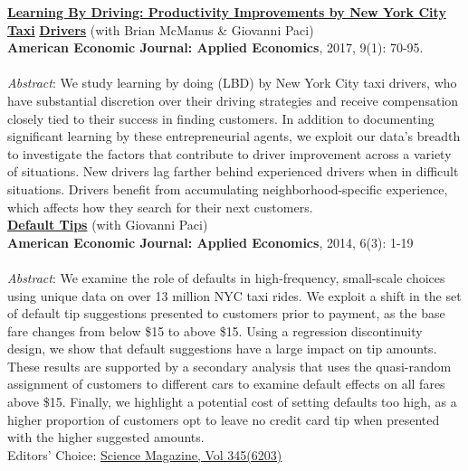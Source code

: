 \documentclass[11pt]{article}
\begin{document}
\href{http://www.kareemhaggag.com/f/Learning_by_Driving.pdf}
{\textbf{Learning By Driving: Productivity Improvements by New York City Taxi}} \href{https://home.uchicago.edu/~haggag/Learning_by_Driving.pdf}{\textbf{Drivers}} (with Brian McManus \& Giovanni Paci) \\
\textbf{American Economic Journal: Applied Economics}, 2017, 9(1): 70-95. \\
\vspace{-.1in} \\
\textit{Abstract}: We study learning by doing (LBD) by New York City taxi drivers, who have substantial discretion over their driving strategies and receive compensation closely tied to their success in finding customers. In addition to documenting significant learning by these entrepreneurial agents, we exploit our data's breadth to investigate the factors that contribute to driver improvement across a variety of situations. New drivers lag farther behind experienced drivers when in difficult situations. Drivers benefit from accumulating neighborhood-specific experience, which affects how they search for their next customers. \\

\href{https://www.kareemhaggag.com/f/Default_Tips.pdf}{\textbf{Default Tips}} (with Giovanni Paci) \\
\textbf{American Economic Journal: Applied Economics}, 2014, 6(3): 1-19 \\
\vspace{-.1in} \\
\textit{Abstract}: We examine the role of defaults in high-frequency, small-scale choices using unique data on over 13 million NYC taxi rides. We exploit a shift in the set of default tip suggestions presented to customers prior to payment, as the base fare changes from below \$15 to above \$15. Using a regression discontinuity design, we show that default suggestions have a large impact on tip amounts. These results are supported by a secondary analysis that uses the quasi-random assignment of customers to different cars to examine default effects on all fares above \$15. Finally, we highlight a potential cost of setting defaults too high, as a higher proportion of customers opt to leave no credit card tip when presented with the higher suggested amounts.
\vspace{.07in} \\
Editors' Choice: \href{http://www.sciencemag.org/content/345/6203/twil.full}{Science Magazine, Vol 345(6203)} \\
\end{document}
